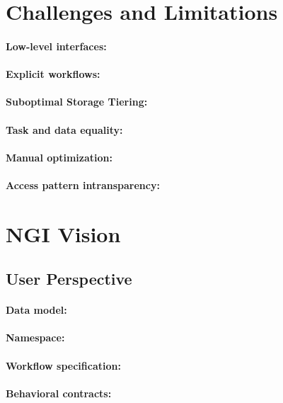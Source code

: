 \documentclass[a4paper, twocolumn]{article}
\begin{document}
\section{Challenges and Limitations}
\label{sec:challenges}
\paragraph{Low-level interfaces:}
\paragraph{Explicit workflows:}
\paragraph{Suboptimal Storage Tiering:}
\paragraph{Task and data equality:}
\paragraph{Manual optimization:}
\paragraph{Access pattern intransparency:}

\section{NGI Vision}
\label{sec:ngiVision}

\subsection{User Perspective}

\newcommand{\bnf}[1]{\textless #1\textgreater}

\paragraph{Data model:}
\paragraph{Namespace:}
\paragraph{Workflow specification:}
\paragraph{Behavioral contracts:}
\end{document}
